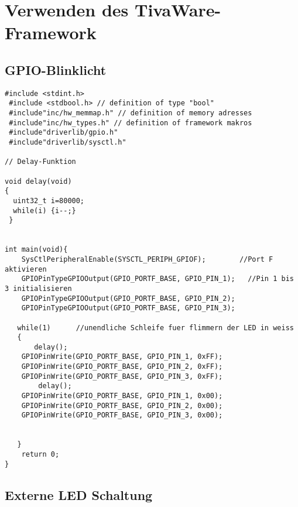 \section{Verwenden des TivaWare-Framework}
\subsection{GPIO-Blinklicht}
\begin{lstlisting}
#include <stdint.h>
 #include <stdbool.h> // definition of type "bool"
 #include"inc/hw_memmap.h" // definition of memory adresses
 #include"inc/hw_types.h" // definition of framework makros
 #include"driverlib/gpio.h"
 #include"driverlib/sysctl.h"
 
// Delay-Funktion

void delay(void)
{
  uint32_t i=80000;
  while(i) {i--;}
 }


int main(void){
    SysCtlPeripheralEnable(SYSCTL_PERIPH_GPIOF);        //Port F aktivieren
    GPIOPinTypeGPIOOutput(GPIO_PORTF_BASE, GPIO_PIN_1);   //Pin 1 bis 3 initialisieren
    GPIOPinTypeGPIOOutput(GPIO_PORTF_BASE, GPIO_PIN_2);
    GPIOPinTypeGPIOOutput(GPIO_PORTF_BASE, GPIO_PIN_3);

   while(1)      //unendliche Schleife fuer flimmern der LED in weiss
   {
       delay();
    GPIOPinWrite(GPIO_PORTF_BASE, GPIO_PIN_1, 0xFF);
    GPIOPinWrite(GPIO_PORTF_BASE, GPIO_PIN_2, 0xFF);
    GPIOPinWrite(GPIO_PORTF_BASE, GPIO_PIN_3, 0xFF);
        delay();
    GPIOPinWrite(GPIO_PORTF_BASE, GPIO_PIN_1, 0x00);
    GPIOPinWrite(GPIO_PORTF_BASE, GPIO_PIN_2, 0x00);
    GPIOPinWrite(GPIO_PORTF_BASE, GPIO_PIN_3, 0x00);


   }
    return 0;
}
\end{lstlisting}




\subsection{Externe LED Schaltung}
